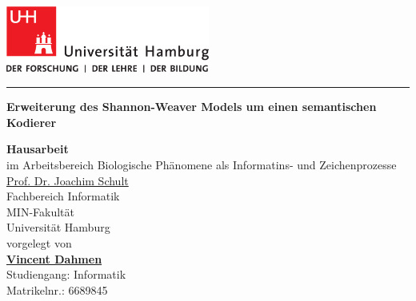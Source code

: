 \documentclass[12pt,final,twoside]{report}
\author{\trauthor}
\makeatletter
\newcommand{\trauthor}{Vincent Dahmen}
\newcommand{\trmatrikelnummer}{6689845}
\newcommand{\trtype}{Hausarbeit} %
\newcommand{\trtitle}{Erweiterung des Shannon-Weaver Models um einen semantischen Kodierer}
\newcommand{\tremail}{4dahmen@informatik.uni-hamburg.de}
\newcommand{\trcourseofstudies}{Informatik} %
\newcommand{\trauthordegree}{} %
\newcommand{\trgutachterA}{\href{mailto:jshult47@gmail.com}{Prof. Dr. Joachim Schult}}
\newcommand{\trfach}{Biologische Phänomene als Informatins- und Zeichenprozesse}
\theoremstyle{plain}
\theoremstyle{definition}
\theoremstyle{remark}
\makeatother
\begin{document}
\renewcommand{\headheight}{14.5pt}      %

\thispagestyle{empty}
\fancyhead[LO,RE]{}                     %


\begin{titlepage}
    \begin{flushleft}
        \includegraphics[width=67mm]{uhhLogoL.pdf}\\
    \end{flushleft}
    \rule{\textwidth}{0.4pt}
        \newline
        \vspace{2.0cm}
        \begin{center}
          \LARGE \textbf{\trtitle}
        \end{center}
    \vspace{2.0cm}
    \begin{center}
      \textbf{\trtype}\\
      im Arbeitsbereich \trfach\\
      \trgutachterA\medskip\\
      Fachbereich Informatik\\
      MIN-Fakult\"at\\
      Universit\"at Hamburg \\[1.0cm] %
      vorgelegt von \\
      \textbf{\href{mailto:\tremail}{\trauthor\trauthordegree}}\\
      Studiengang:   \trcourseofstudies \\
      Matrikelnr.:  \trmatrikelnummer \\

\end{center}
\end{titlepage}
\end{document}
